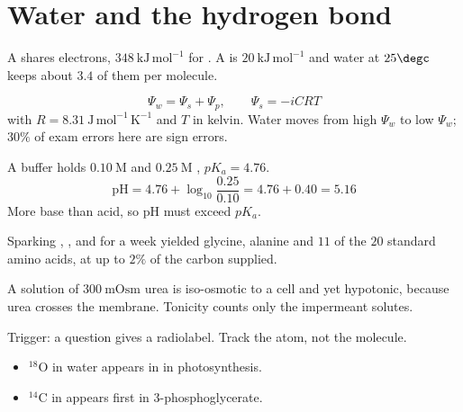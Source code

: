 
\section{Water and the hydrogen bond}

\begin{defbox}[title={DEFINITIONS: bonds and forces}]
A  shares electrons, $348\ \mathrm{kJ\,mol^{-1}}$ for . A
 is $20\ \mathrm{kJ\,mol^{-1}}$ and water at $25\degc$ keeps about
$3.4$ of them per molecule.
\end{defbox}

\begin{keybox}[title={MEMORIZE: the water potential equation}]
\[
\Psi_w=\Psi_s+\Psi_p,\qquad \Psi_s=-iCRT
\]
with $R=8.31\ \mathrm{J\,mol^{-1}\,K^{-1}}$ and $T$ in kelvin. Water moves from high
$\Psi_w$ to low $\Psi_w$; $30\%$ of exam errors here are sign errors.
\end{keybox}

\begin{calcbox}[title={WORKED: buffer pH}]
A buffer holds $0.10\ \mathrm{M}$  and $0.25\ \mathrm{M}$ ,
$pK_a=4.76$.
\[
\mathrm{pH}=4.76+\log_{10}\frac{0.25}{0.10}=4.76+0.40=5.16
\]
 More base than acid, so pH must exceed $pK_a$. \tm{$\surd$}
\end{calcbox}

\begin{expbox}[title={EXPERIMENT: Miller and Urey, 1953}]
Sparking , ,  and  for a week yielded glycine, alanine
and $11$ of the $20$ standard amino acids, at up to $2\%$ of the carbon supplied.
\end{expbox}

\begin{warnbox}[title={TRAP: osmolarity is not tonicity}]
A solution of $300\ \mathrm{mOsm}$ urea is iso-osmotic to a cell and yet hypotonic,
because urea crosses the membrane. Tonicity counts only the impermeant solutes.
\end{warnbox}

\begin{tipbox}[title={TECHNIQUE: follow the labelled atom}]
Trigger: a question gives a radiolabel. Track the atom, not the molecule.
\begin{itemize}
\item $^{18}$O in water appears in  in photosynthesis.
\item $^{14}$C in  appears first in 3-phosphoglycerate.
\end{itemize}
\end{tipbox}


